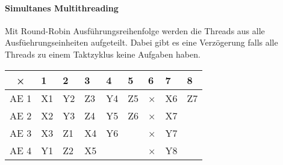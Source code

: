 \paragraph{Simultanes Multithreading} Mit Round-Robin Ausführungsreihenfolge werden die Threads
aus alle Ausfüehrungseinheiten aufgeteilt. Dabei gibt es eine Verzögerung falls alle Threads
zu einem Taktzyklus keine Aufgaben haben.\par
\begingroup\setlength\tabcolsep{2pt}
\begin{tabular}{|c|llllllll|}\hline
  ×  & 1 & 2 & 3 & 4 & 5 & 6 & 7 & 8 \\\hline
AE 1 & X1 & Y2 & Z3 & Y4 & Z5 & × & X6 & Z7 \\
AE 2 & X2 & Y3 & Z4 & Y5 & Z6 & × & X7 &    \\
AE 3 & X3 & Z1 & X4 & Y6 &    & × & Y7 &    \\
AE 4 & Y1 & Z2 & X5 &    &    & × & Y8 &    \\\hline
\end{tabular}
\endgroup
